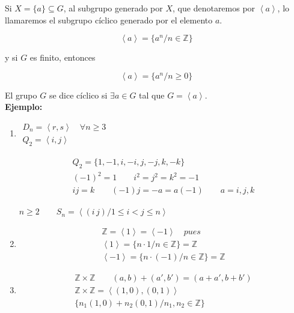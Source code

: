 \documentclass{article}
\begin{document}
Si $X=\{a\}\subseteq G$, al subgrupo generado por $X$, que denotaremos por $\left\langle a \right\rangle$, lo llamaremos el subgrupo cíclico generado por el elemento $a$.

\begin{equation*}
\left\langle a \right\rangle=\{a^n/n\in \mathbb{Z}\}
\end{equation*}

y si $G$ es finito, entonces

\begin{equation*}
\left\langle a \right\rangle = \{a^n/n\geq 0\}
\end{equation*}

El grupo $G$ se dice cíclico si $\exists a \in G$ tal que $G=\left\langle a \right\rangle$. \\

\textbf{Ejemplo:}
\begin{enumerate}[1)]
\item $\left. \begin{array}{c}
D_n=\left\langle r,s\right\rangle \quad \forall n\geq 3 \\
Q_2=\left\langle i, j\right\rangle
\end{array} \right.$

\begin{gather*}
Q_2=\{1,-1,i,-i,j,-j,k,-k\} \\
(-1)^2=1 \qquad i^2=j^2=k^2=-1 \\
ij=k \qquad (-1)j=-a=a(-1) \qquad a=i,j,k 
\end{gather*}

$n\geq 2 \qquad S_n=\left\langle (i\,j)/1\leq i < j \leq n \right\rangle$

\item 
\begin{gather*}
\mathbb{Z}=\left\langle 1 \right\rangle = \left\langle -1 \right\rangle \quad pues \\
\left\langle 1 \right\rangle = \{n\cdot 1/n \in \mathbb{Z}\}=\mathbb{Z} \\
\left\langle -1 \right\rangle = \{n\cdot(-1)/n \in \mathbb{Z}\}=\mathbb{Z}
\end{gather*}

\item 
\begin{gather*}
\mathbb{Z}\times \mathbb{Z} \qquad (a,b)+(a',b')=(a+a',b+b') \\
\mathbb{Z}\times \mathbb{Z}=\left\langle (1,0),(0,1)\right\rangle \\
\{n_1(1,0)+n_2(0,1)/n_1,n_2\in\mathbb{Z}\}
\end{gather*}
\end{enumerate}
\end{document}
